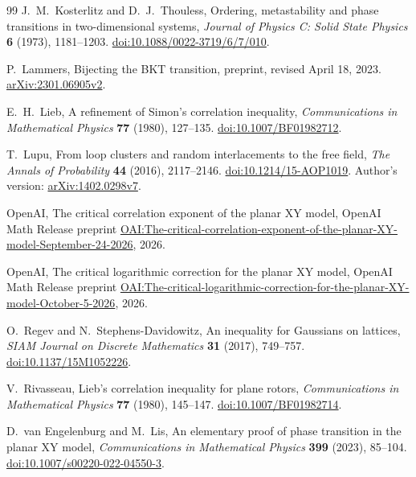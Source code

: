 \begin{thebibliography}{99}
J.~M.~Kosterlitz and D.~J.~Thouless,
Ordering, metastability and phase transitions in two-dimensional systems,
\emph{Journal of Physics C: Solid State Physics} \textbf{6} (1973), 1181--1203.
\href{https://doi.org/10.1088/0022-3719/6/7/010}{doi:10.1088/0022-3719/6/7/010}.

P.~Lammers,
Bijecting the BKT transition,
preprint, revised April 18, 2023.
\href{https://arxiv.org/abs/2301.06905v2}{arXiv:2301.06905v2}.

E.~H.~Lieb,
A refinement of Simon's correlation inequality,
\emph{Communications in Mathematical Physics} \textbf{77} (1980), 127--135.
\href{https://doi.org/10.1007/BF01982712}{doi:10.1007/BF01982712}.

T.~Lupu,
From loop clusters and random interlacements to the free field,
\emph{The Annals of Probability} \textbf{44} (2016), 2117--2146.
\href{https://doi.org/10.1214/15-AOP1019}{doi:10.1214/15-AOP1019}.
Author's version:
\href{https://arxiv.org/abs/1402.0298v7}{arXiv:1402.0298v7}.

OpenAI,
The critical correlation exponent of the planar XY model,
OpenAI Math Release preprint
\href{https://github.com/openai/math/blob/main/preprints/The-critical-correlation-exponent-of-the-planar-XY-model-September-24-2026/paper.pdf}{OAI:The-critical-correlation-exponent-of-the-planar-XY-model-September-24-2026},
2026.

OpenAI,
The critical logarithmic correction for the planar XY model,
OpenAI Math Release preprint
\href{https://github.com/openai/math/blob/main/preprints/The-critical-logarithmic-correction-for-the-planar-XY-model-October-5-2026/paper.pdf}{OAI:The-critical-logarithmic-correction-for-the-planar-XY-model-October-5-2026},
2026.

O.~Regev and N.~Stephens-Davidowitz,
An inequality for Gaussians on lattices,
\emph{SIAM Journal on Discrete Mathematics} \textbf{31} (2017), 749--757.
\href{https://doi.org/10.1137/15M1052226}{doi:10.1137/15M1052226}.

V.~Rivasseau,
Lieb's correlation inequality for plane rotors,
\emph{Communications in Mathematical Physics} \textbf{77} (1980), 145--147.
\href{https://doi.org/10.1007/BF01982714}{doi:10.1007/BF01982714}.

D.~van Engelenburg and M.~Lis,
An elementary proof of phase transition in the planar XY model,
\emph{Communications in Mathematical Physics} \textbf{399} (2023), 85--104.
\href{https://doi.org/10.1007/s00220-022-04550-3}{doi:10.1007/s00220-022-04550-3}.

\end{thebibliography}
